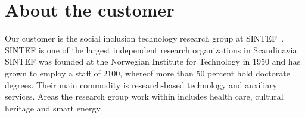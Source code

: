 \section{About the customer}

Our customer is the social inclusion technology research group at SINTEF~\cite{sintef}. SINTEF is one of the largest independent research organizations in Scandinavia. SINTEF was founded at the Norwegian Institute for Technology in 1950 and has grown to employ a staff of 2100, whereof more than 50 percent hold doctorate degrees. Their main commodity is research-based technology and auxiliary services. Areas the research group work within includes health care, cultural heritage and smart energy.

